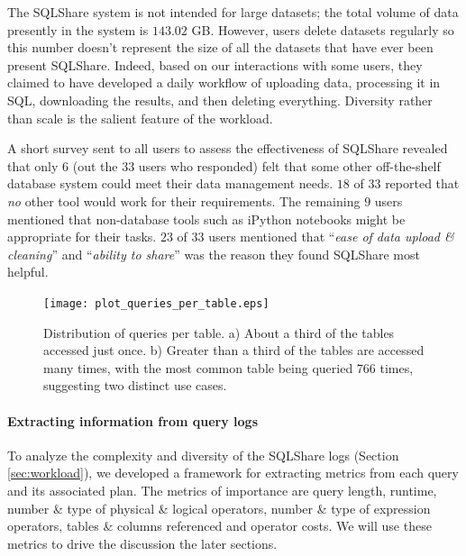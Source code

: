 \documentclass{sig-alternate}
\newcommand{\note}[2]{{\color{#1} {#2}}}
\newcommand{\reviewmeta}[1]{\note{black}{#1}}
\newcommand{\sqlshare}{SQLShare}
\begin{document}
The \sqlshare{} system is not intended for large datasets; the total volume of data presently in the system is $143.02$ GB. However, users delete datasets regularly so this number doesn't represent the size of all the datasets that have ever been present \sqlshare{}.  Indeed, \reviewmeta{based on our interactions with some users, they claimed to} have developed a daily workflow of uploading data, processing it in SQL, downloading the results, and then deleting everything. 
Diversity rather than scale is the salient feature of the workload.

\reviewmeta{A short survey sent to all users to assess the effectiveness of \sqlshare{} revealed that only $6$ (out the $33$ users who responded) felt that some other off-the-shelf database system could meet their data management needs. $18$ of $33$ reported that \emph{no} other tool would work for their requirements. The remaining $9$ users mentioned that non-database tools such as iPython notebooks might be appropriate for their tasks. $23$ of $33$ users mentioned that ``\emph{ease of data upload \& cleaning}'' and ``\emph{ability to share}'' was the reason they found \sqlshare{} most helpful.}

\begin{figure}[h]
\centering
\texttt{[image: plot\_queries\_per\_table.eps]}
\caption{Distribution of queries per table. a) About a third of the tables accessed just once. b) Greater than a third of the tables are accessed many times, with the most common table being queried 766 times, suggesting two distinct use cases.}
\label{fig:queriespertable}
\end{figure}

\paragraph{Extracting information from query logs}
\label{sec:extract}
To analyze the complexity and diversity of the \sqlshare{} logs (Section \ref{sec:workload}), we developed a framework for extracting metrics from each query and its associated plan. The metrics of importance are query length, runtime, number \& type of physical \& logical operators, number \& type of expression operators, tables \& columns referenced and operator costs. We will use these metrics to drive the discussion the later sections.
\end{document}
